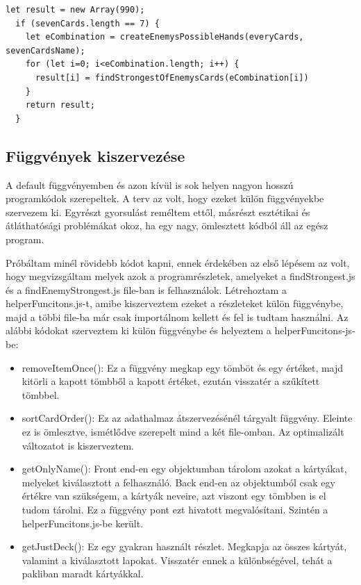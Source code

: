 \begin{lstlisting}[style=htmlcssjs]
  let result = new Array(990);
  if (sevenCards.length == 7) {
    let eCombination = createEnemysPossibleHands(everyCards, sevenCardsName);
    for (let i=0; i<eCombination.length; i++) {
      result[i] = findStrongestOfEnemysCards(eCombination[i])
    }
    return result;
  }
\end{lstlisting}

\subsection{Függvények kiszervezése}
A default függvényemben és azon kívül is sok helyen nagyon hosszú programkódok szerepeltek. A terv az volt, hogy ezeket külön függvényekbe szervezem ki. Egyrészt gyorsulást reméltem ettől, másrészt esztétikai és átláthatósági problémákat okoz, ha egy nagy, ömlesztett kódból áll az egész program.

Próbáltam minél rövidebb kódot kapni, ennek érdekében az első lépésem az volt, hogy megvizsgáltam melyek azok a programrészletek, amelyeket a findStrongest.js és a findEnemyStrongest.js file-ban is felhasználok. Létrehoztam a helperFuncitons.js-t, amibe kiszerveztem ezeket a részleteket külön függvénybe, majd a többi file-ba már csak importálnom kellett és fel is tudtam használni. Az alábbi kódokat szerveztem ki külön függvénybe és helyeztem a helperFuncitons-js-be:
\begin{itemize}
    \item removeItemOnce(): Ez a függvény megkap egy tömböt és egy értéket, majd kitörli a kapott tömbből a kapott értéket, ezután visszatér a szűkített tömbbel.
    \item sortCardOrder(): Ez az adathalmaz átszervezésénél tárgyalt függvény. Eleinte ez is ömlesztve, ismétlődve szerepelt mind a két file-omban. Az optimalizált változatot is kiszerveztem.
    \item getOnlyName(): Front end-en egy objektumban tárolom azokat a kártyákat, melyeket kiválasztott a felhasználó. Back end-en az objektumból csak egy értékre van szükségem, a kártyák neveire, azt viszont egy tömbben is el tudom tárolni. Ez a függvény pont ezt hivatott megvalósítani. Szintén a helperFuncitons.js-be került.
    \item getJustDeck(): Ez egy gyakran használt részlet. Megkapja az összes kártyát, valamint a kiválasztott lapokat. Visszatér ennek a különbségével, tehát a pakliban maradt kártyákkal.
\end{itemize}

